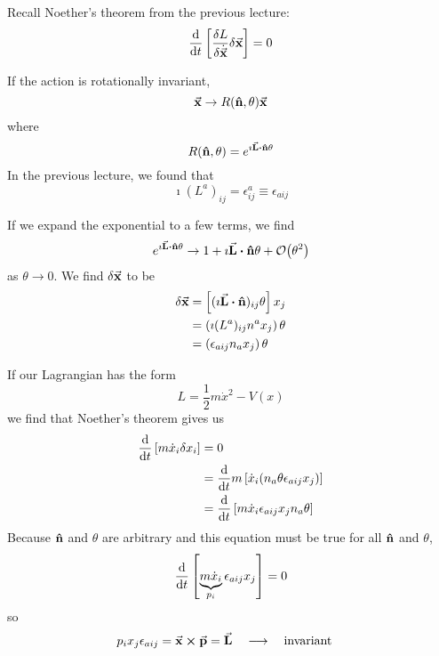 \documentclass[a4paper,twoside,master.tex]{subfiles}
\begin{document}

Recall Noether's theorem from the previous lecture:
\begin{equation}
    \dv{t}\left[ \fdv{L}{\dot{\va{x}}} \delta\va{ x} \right] = 0
\end{equation}

If the action is rotationally invariant, 
\begin{equation}
    \va{ x} \to R(\vu{n}, \theta)\va{ x}
\end{equation}
where
\begin{equation}
    R(\vu{n}, \theta) = e^{\imath\va{ L} \vdot\vu{ n} \theta}
\end{equation}
In the previous lecture, we found that
\begin{equation}
    \imath (L^a)_{ij} = \epsilon^a_{ij} \equiv \epsilon_{aij}
\end{equation}

If we expand the exponential to a few terms, we find
\begin{equation}
    e^{\imath\va{ L} \vdot\vu{ n} \theta} \to 1 + \imath\va{ L} \vdot\vu{ n} \theta + \order{\theta^2}
\end{equation}
as $ \theta \to 0 $. We find $ \delta\va{ x} $ to be
\begin{align}
    \delta\va{ x} &= \left[ (\imath\va{ L} \vdot\vu{ n})_{ij} \theta \right] x_j \\
    &= \left( \imath (L^a)_{ij} n^a x_j \right) \theta \\
    &= \left( \epsilon_{aij} n_a x_j \right) \theta
\end{align}

If our Lagrangian has the form
\begin{equation}
    L = \frac{1}{2} m \dot{x}^2 - V(x)
\end{equation}
we find that Noether's theorem gives us
\begin{align}
    \dv{t}\left[ m\dot{x}_i \delta x_i \right] &= 0 \\
    &= \dv{t} m \left[ \dot{x}_i ( n_a \theta \epsilon_{aij} x_j) \right] \\
    &= \dv{t}\left[ m \dot{x}_i \epsilon_{aij} x_j n_a \theta\right]
\end{align}
Because $\vu{ n} $ and $ \theta $ are arbitrary and this equation must be true for all $\vu{ n} $ and $ \theta $,
\begin{equation}
    \dv{t}\left[ \underbrace{m\dot{x}_i}_{p_i} \epsilon_{aij} x_j \right] = 0
\end{equation}
so
\begin{equation}
    p_i x_j \epsilon_{aij} =\va{ x} \cross\va{ p} =\va{ L} \quad \longrightarrow \qq{invariant}
\end{equation}
\end{document}
